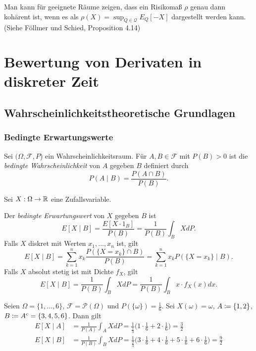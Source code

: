 \documentclass[a4paper,twoside,DIV15,BCOR12mm]{scrbook}
\newcommand{\cF}{\mathcal F}
\begin{document}
Man kann für geeignete Räume zeigen, dass ein Risikomaß $\rho$ genau dann kohärent ist, wenn es als $\rho(X) = \sup_{Q\in\mathcal Q}E_Q[-X]$ dargestellt werden kann. (Siehe Föllmer und Schied, Proposition 4.14)

\chapter{Bewertung von Derivaten in diskreter Zeit}
\section{Wahrscheinlichkeitstheoretische Grundlagen}
\subsection{Bedingte Erwartungswerte}

Sei $(\Omega, \cF, P$) ein Wahrscheinlichkeitsraum. Für $A,B\in\cF$ mit $P(B)>0$ ist die \emph{bedingte Wahrscheinlichkeit} von $A$ gegeben $B$ definiert durch
\[
P(A\mid B) = \frac{P(A\cap B)}{P(B)}.
\]

Sei $X:\Omega \to \mathbb{R}$ eine Zufallsvariable.
\begin{definition}
Der \emph{bedingte Erwartungswert} von $X$ gegeben $B$ ist
\[
E[X\mid B] = \frac{E[X \cdot 1_B]}{P(B)} = \frac{1}{P(B)} \int_B X dP.
\] 
Falls $X$ diskret mit Werten $x_1,\ldots,x_n$ ist, gilt
\[
E[X\mid B] = \sum_{k=1}^n x_k \frac{P(\{X=x_k\}\cap B)}{P(B)}
= \sum_{k=1}^{n} x_k P(\{X=x_k\}\mid B).
\]
Falls $X$ absolut stetig ist mit Dichte $f_X$, gilt 
\[
E[X\mid B] = \frac{1}{P(B)} \int_B XdP
=\frac{1}{P(B)} \int_B x\cdot f_X(x) dx.
\]
\end{definition}

\begin{beispiel}[Würfel]
Seien $\Omega = \{1,\ldots,6\}$, $\cF = \mathcal P(\Omega)$ und $P(\{\omega\})=\frac 16$. Sei $X(\omega)=\omega$, $A\da \{1,2\}$, $B \da A^c = \{3,4,5,6\}$. Dann gilt 
\begin{align*}
E[X\mid A] &= \frac1{P(A)} \int_A XdP = \frac1{\frac13} \big(1\cdot \frac 16 + 2\cdot\frac16\big) = \frac 32 \\
E[X\mid B] &= \frac1{P(B)} \int_B XdP = \frac1{\frac23} \big(3\cdot \frac 16 + 4\cdot\frac16 + 5\cdot\frac16 + 6\cdot\frac16\big) = \frac 92
\end{align*}
\end{beispiel}
\end{document}
